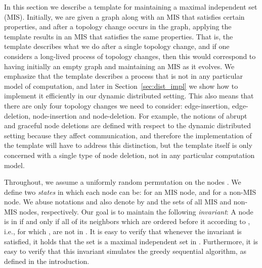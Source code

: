 In this section we describe a template for maintaining a maximal independent set (MIS). Initially, we are given a graph  along with an MIS that satisfies certain properties, and after a topology change occurs in the graph, applying the template results in an MIS that satisfies the same properties. That is, the template describes what we do after a single topology change, and if one considers a long-lived process of topology changes, then this would correspond to having initially an empty graph and maintaining an MIS as it evolves. We emphasize that the template describes a process that is not in any particular model of computation, and later in Section~\ref{sec:dist_impl} we show how to implement it efficiently in our dynamic distributed setting. This also means that there are only four topology changes we need to consider: edge-insertion, edge-deletion, node-insertion and node-deletion. For example, the notions of abrupt and graceful node deletions are defined with respect to the dynamic distributed setting because they affect communication, and therefore the implementation of the template will have to address this distinction, but the template itself is only concerned with a single type of node deletion, not in any particular computation model.


Throughout, we assume a uniformly random permutation  on the nodes . We define two \emph{states} in which each node can be:   for an MIS node, and  for a non-MIS node. We abuse notations and also denote by  and  the sets of all MIS and non-MIS nodes, respectively. Our goal is to maintain the following \emph{\MIS invariant}: A node  is in  if and only if all of its neighbors  which are ordered before it according to , i.e., for which , are not in . It is easy to verify that whenever the \MIS invariant is satisfied, it holds that the set  is a maximal independent set in .
Furthermore, it is easy to verify that this invariant simulates the greedy sequential algorithm, as defined in the introduction.

